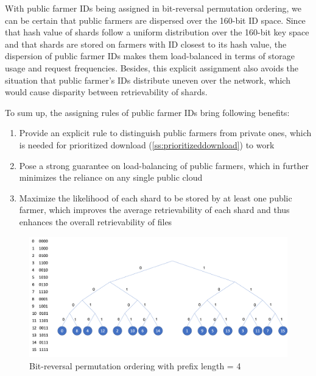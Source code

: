 With public farmer IDs being assigned in bit-reversal permutation ordering, we can be certain that public farmers are dispersed over the 160-bit ID space. Since that hash value of shards follow a uniform distribution over the 160-bit key space and that shards are stored on farmers with ID closest to its hash value, the dispersion of public farmer IDs makes them load-balanced in terms of storage usage and request frequencies. Besides, this explicit assignment also avoids the situation that public farmer's IDs distribute uneven over the network, which would cause disparity between retrievability of shards.

To sum up, the assigning rules of public farmer IDs bring following benefits:

\begin{enumerate}
  \item Provide an explicit rule to distinguish public farmers from private ones, which is needed for prioritized download (\ref{ss:prioritizeddownload}) to work
  \item Pose a strong guarantee on load-balancing of public farmers, which in further minimizes the reliance on any single public cloud
  \item Maximize the likelihood of each shard to be stored by at least one public farmer, which improves the average retrievability of each shard and thus enhances the overall retrievability of files
\end{enumerate}

\begin{figure}[hbt]
\centering
  \includegraphics[width=16cm]{figures/bit_reversal_permutation_ordering.png}
  \caption{Bit-reversal permutation ordering with prefix length = 4}
  \label{fig:bitreversalpermutationordering}
\end{figure}